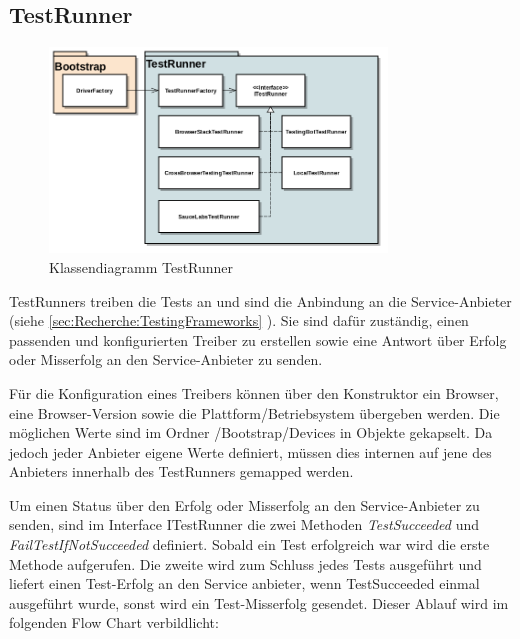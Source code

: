 \subsection{TestRunner}
\label{sec:umsetzung:architektur:testrunner}
\begin{figure}[H]
	\centering
	\includegraphics[width=0.8\textwidth]{images/semesterarbeit class diagram - testrunner.png}
	\caption{Klassendiagramm TestRunner}
	\label{fig:umsetzung:architektur:testrunners}
\end{figure}
TestRunners treiben die Tests an und sind die Anbindung an die Service-Anbieter (siehe \cref{sec:Recherche:TestingFrameworks} ). Sie sind dafür zuständig, einen passenden und konfigurierten Treiber zu erstellen sowie eine Antwort über Erfolg oder Misserfolg an den Service-Anbieter zu senden.

Für die Konfiguration eines Treibers können über den Konstruktor ein Browser, eine Browser-Version sowie die Plattform/Betriebsystem übergeben werden. Die möglichen Werte sind im Ordner /Bootstrap/Devices in Objekte gekapselt. Da jedoch jeder Anbieter eigene Werte definiert, müssen dies internen auf jene des Anbieters innerhalb des TestRunners gemapped werden.

Um einen Status über den Erfolg oder Misserfolg an den Service-Anbieter zu senden, sind im Interface ITestRunner die zwei Methoden \textit{TestSucceeded} und \textit{FailTestIfNotSucceeded} definiert. Sobald ein Test erfolgreich war wird die erste Methode aufgerufen. Die zweite wird zum Schluss jedes Tests ausgeführt und liefert einen Test-Erfolg an den Service anbieter, wenn TestSucceeded einmal ausgeführt wurde, sonst wird ein Test-Misserfolg gesendet. Dieser Ablauf wird im folgenden Flow Chart verbildlicht:


